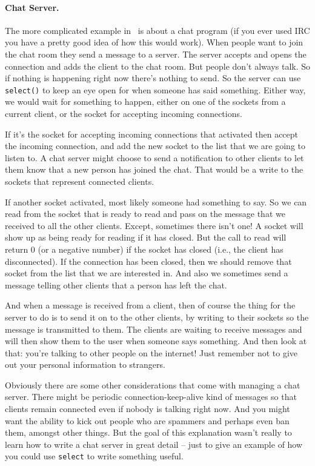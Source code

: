 \paragraph{Chat Server.} The more complicated example in~\cite{getaddrinfo} is about a chat program (if you ever used IRC you have a pretty good idea of how this would work). When people want to join the chat room they send a message to a server. The server accepts and opens the connection and adds the client to the chat room. But people don't always talk. So if nothing is happening right now there's nothing to send. So the server can use \texttt{select()} to keep an eye open for when someone has said something. Either way, we would wait for something to happen, either on one of the sockets from a current client, or the socket for accepting incoming connections.

If it's the socket for accepting incoming connections that activated then accept the incoming connection, and add the new socket to the list that we are going to listen to. A chat server might choose to send a notification to other clients to let them know that a new person has joined the chat. That would be a write to the sockets that represent connected clients.

If another socket activated, most likely someone had something to say. So we can read from the socket that is ready to read and pass on the message that we received to all the other clients. Except, sometimes there isn't one! A socket will show up as being ready for reading if it has closed. But the call to read will return 0 (or a negative number) if the socket has closed (i.e., the client has disconnected). If the connection has been closed, then we should remove that socket from the list that we are interested in. And also we sometimes send a message telling other clients that a person has left the chat.

And when a message is received from a client, then of course the thing for the server to do is to send it on to the other clients, by writing to their sockets so the message is transmitted to them. The clients are waiting to receive messages and will then show them to the user when someone says something. And then look at that: you're talking to other people on the internet! Just remember not to give out your personal information to strangers.

Obviously there are some other considerations that come with managing a chat server. There might be periodic connection-keep-alive kind of messages so that clients remain connected even if nobody is talking right now. And you might want the ability to kick out people who are spammers and perhaps even ban them, amongst other things. But the goal of this explanation wasn't really to learn how to write a chat server in great detail -- just to give an example of how you could use \texttt{select} to write something useful.


